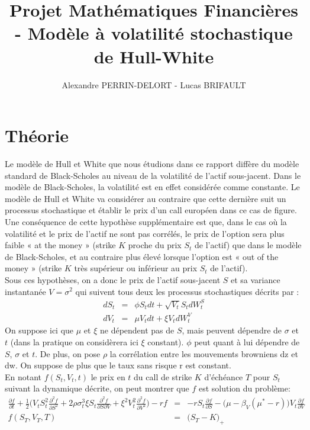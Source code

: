\documentclass{report}
\title{Projet Mathématiques Financières - Modèle à volatilité stochastique de Hull-White}
\date{}
\author{Alexandre PERRIN-DELORT  -  Lucas BRIFAULT}
\begin{document}
\maketitle
\section*{Théorie}
Le modèle de Hull et White que nous étudions dans ce rapport diffère du modèle standard de Black-Scholes au niveau de la volatilité de l’actif sous-jacent. Dans le modèle de Black-Scholes, la volatilité est en effet considérée comme constante.  Le modèle de Hull et White va considérer au contraire que cette dernière suit un processus stochastique et établir le prix d’un call européen dans ce cas de figure.\\ 
Une conséquence de cette hypothèse supplémentaire est que, dans le cas où la volatilité et le prix de l’actif ne sont pas corrélés, le prix de l’option sera plus faible « at the money » (strike $K$ proche du prix $S_t$ de l’actif) que dans le modèle de Black-Scholes, et au contraire plus élevé lorsque l’option est « out of the money » (strike $K$ très supérieur ou inférieur au prix $S_t$ de  l’actif).\\
Sous ces hypothèses, on a donc le prix de l’actif sous-jacent $S$ et sa variance instantanée $V = \sigma^2$ qui suivent tous deux les processus stochastiques décrits par :
\begin{eqnarray*}
dS_t &=& \phi S_t dt + \sqrt{V_t}S_t dW^S_t\\
dV_t &=& \mu V_t dt + \xi V_t dW^V_t
\end{eqnarray*}
On suppose ici que $\mu$ et $\xi$ ne dépendent pas de $S$, mais peuvent dépendre de $\sigma$ et $t$ (dans la pratique on considèrera ici $\xi$ constant). $\phi$ peut quant à lui dépendre de $S$, $\sigma$ et $t$. De plus, on pose $\rho$ la corrélation entre les mouvements browniens dz et dw.  On suppose de plus que le taux sans risque r est constant.\\
En notant $f(S_t, V_t, t)$ le prix en $t$ du call de strike $K$ d'échéance $T$ pour $S_t$ suivant la dynamique décrite, on peut montrer que $f$ est solution du problème:
\begin{eqnarray*}
\frac{\partial f}{\partial t} + \frac{1}{2}\Big(V_t S_t^2 \frac{\partial^2 f}{\partial S^2} + 2\rho \sigma_t^3 \xi S_t\frac{\partial^2 f}{\partial S\partial V} + \xi^2 V_t^2\frac{\partial^2 f}{\partial V^2}\Big) -rf &=& -rS_t\frac{\partial f}{\partial S} - \Big(\mu -\beta_V(\mu^* - r)\Big)V_t\frac{\partial f}{\partial V}\\
f(S_T, V_T, T) &=& \big(S_T - K\big)_+
\end{eqnarray*}
\end{document}
